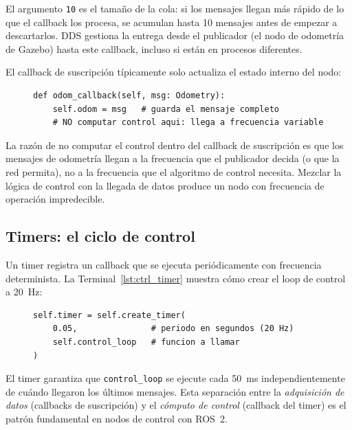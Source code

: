 El argumento \texttt{10} es el tamaño de la cola: si los mensajes llegan más rápido de lo que el callback los procesa, se acumulan hasta 10 mensajes antes de empezar a descartarlos. DDS gestiona la entrega desde el publicador (el nodo de odometría de Gazebo) hasta este callback, incluso si están en procesos diferentes.

El callback de suscripción típicamente solo actualiza el estado interno del nodo:

\begin{figure}[H]
\centering
\begin{lstlisting}[style=python, caption={Callback de suscripción: actualiza estado, no computa control.}, label={lst:odom_cb}]
def odom_callback(self, msg: Odometry):
    self.odom = msg   # guarda el mensaje completo
    # NO computar control aqui: llega a frecuencia variable
\end{lstlisting}
\end{figure}

La razón de no computar el control dentro del callback de suscripción es que los mensajes de odometría llegan a la frecuencia que el publicador decida (o que la red permita), no a la frecuencia que el algoritmo de control necesita. Mezclar la lógica de control con la llegada de datos produce un nodo con frecuencia de operación impredecible.

\subsection{Timers: el ciclo de control}

Un timer registra un callback que se ejecuta periódicamente con frecuencia determinista. La Terminal~\ref{lst:ctrl_timer} muestra cómo crear el loop de control a 20~Hz:

\begin{figure}[H]
\centering
\begin{lstlisting}[style=python, caption={Registro de un timer de control a 20~Hz.}, label={lst:ctrl_timer}]
self.timer = self.create_timer(
    0.05,               # periodo en segundos (20 Hz)
    self.control_loop   # funcion a llamar
)
\end{lstlisting}
\end{figure}

El timer garantiza que \texttt{control\_loop} se ejecute cada 50~ms independientemente de cuándo llegaron los últimos mensajes. Esta separación entre la \textit{adquisición de datos} (callbacks de suscripción) y el \textit{cómputo de control} (callback del timer) es el patrón fundamental en nodos de control con ROS~2.

